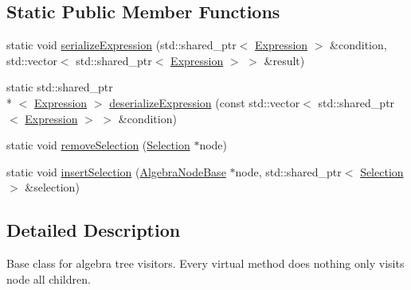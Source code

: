 \subsection*{Static Public Member Functions}
\begin{DoxyCompactItemize}
\item 
static void \hyperlink{classrafe_1_1_algebra_visitor_a9d363c344928367680e60d1f7606ad06}{serialize\+Expression} (std\+::shared\+\_\+ptr$<$ \hyperlink{classrafe_1_1_expression}{Expression} $>$ \&condition, std\+::vector$<$ std\+::shared\+\_\+ptr$<$ \hyperlink{classrafe_1_1_expression}{Expression} $>$ $>$ \&result)
\item 
static std\+::shared\+\_\+ptr\\*
$<$ \hyperlink{classrafe_1_1_expression}{Expression} $>$ \hyperlink{classrafe_1_1_algebra_visitor_aee992f1216f75570dc7073f5031ecf7f}{deserialize\+Expression} (const std\+::vector$<$ std\+::shared\+\_\+ptr$<$ \hyperlink{classrafe_1_1_expression}{Expression} $>$ $>$ \&condition)
\item 
static void \hyperlink{classrafe_1_1_algebra_visitor_a1de5a4866096b3da07f921d351f437e7}{remove\+Selection} (\hyperlink{classrafe_1_1_selection}{Selection} $\ast$node)
\item 
static void \hyperlink{classrafe_1_1_algebra_visitor_a4eb384d25bff8d19c3d0d7310d33bf81}{insert\+Selection} (\hyperlink{classrafe_1_1_algebra_node_base}{Algebra\+Node\+Base} $\ast$node, std\+::shared\+\_\+ptr$<$ \hyperlink{classrafe_1_1_selection}{Selection} $>$ \&selection)
\end{DoxyCompactItemize}


\subsection{Detailed Description}
Base class for algebra tree visitors. Every virtual method does nothing only visits node all children. 


